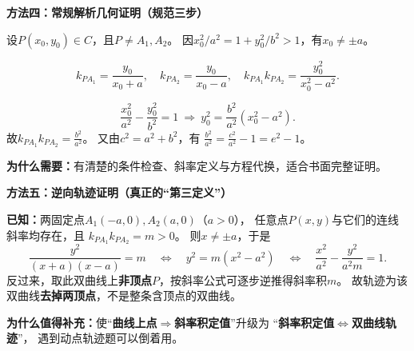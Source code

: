 \clearpage
\begin{proofbox}
\textbf{\textcolor{CProof}{方法四：常规解析几何证明（规范三步）}}
\begin{center}\end{center}


\begin{description}[style=nextline,leftmargin=2.8em,itemsep=0.4em]
 \item[\textbf{步骤1（明确定义域并设点）：}]
 设\(P(x_0,y_0)\in C\)，且\(P\ne A_1,A_2\)。
 因\(x_0^2/a^2=1+y_0^2/b^2>1\)，有\(x_0\ne\pm a\)。
 \item[\textbf{步骤2（写斜率）：}]
 \[
 k_{PA_1}=\frac{y_0}{x_0+a},\quad
 k_{PA_2}=\frac{y_0}{x_0-a},\quad
 k_{PA_1}k_{PA_2}=\frac{y_0^2}{x_0^2-a^2}.
 \]
 \item[\textbf{步骤3（代入标准方程）：}]
 \[
 \frac{x_0^2}{a^2}-\frac{y_0^2}{b^2}=1
 \ \Longrightarrow\ 
 y_0^2=\frac{b^2}{a^2}(x_0^2-a^2).
 \]
 故\(k_{PA_1}k_{PA_2}=\frac{b^2}{a^2}\)。
 又由\(c^2=a^2+b^2\)，有
 \(\frac{b^2}{a^2}=\frac{c^2}{a^2}-1=e^2-1\)。
\end{description}

\textbf{为什么需要：}有清楚的条件检查、斜率定义与方程代换，适合书面完整证明。

\medskip
\end{proofbox}
\clearpage
\begin{proofbox}
\textbf{\textcolor{CProof}{方法五：逆向轨迹证明（真正的“第三定义”）}}
\begin{center}\end{center}


\textbf{已知：}两固定点\(A_1(-a,0),A_2(a,0)\)（\(a>0\)），
任意点\(P(x,y)\)与它们的连线斜率均存在，且
\(k_{PA_1}k_{PA_2}=m>0\)。
则\(x\ne\pm a\)，于是
\[
 \frac{y^2}{(x+a)(x-a)}=m
 \quad\Longleftrightarrow\quad
 y^2=m(x^2-a^2)
 \quad\Longleftrightarrow\quad
 \boxed{\frac{x^2}{a^2}-\frac{y^2}{a^2m}=1}.
\]
反过来，取此双曲线上\textbf{非顶点}\(P\)，按斜率公式可逐步逆推得斜率积\(m\)。
故轨迹为该双曲线\textbf{去掉两顶点}，不是整条含顶点的双曲线。

\textbf{为什么值得补充：}使“\textbf{曲线上点\(\Rightarrow\)斜率积定值}”升级为
“\textbf{斜率积定值\(\Longleftrightarrow\)双曲线轨迹}”，
遇到动点轨迹题可以倒着用。

\medskip
\end{proofbox}

